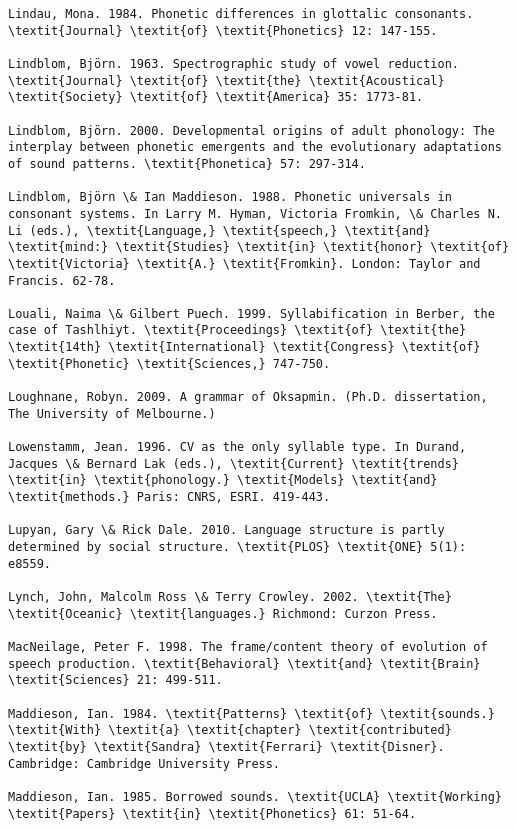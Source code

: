 \begin{verbatim}
Lindau, Mona. 1984. Phonetic differences in glottalic consonants. \textit{Journal} \textit{of} \textit{Phonetics} 12: 147-155.

Lindblom, Björn. 1963. Spectrographic study of vowel reduction. \textit{Journal} \textit{of} \textit{the} \textit{Acoustical} \textit{Society} \textit{of} \textit{America} 35: 1773-81.

Lindblom, Björn. 2000. Developmental origins of adult phonology: The interplay between phonetic emergents and the evolutionary adaptations of sound patterns. \textit{Phonetica} 57: 297-314.

Lindblom, Björn \& Ian Maddieson. 1988. Phonetic universals in consonant systems. In Larry M. Hyman, Victoria Fromkin, \& Charles N. Li (eds.), \textit{Language,} \textit{speech,} \textit{and} \textit{mind:} \textit{Studies} \textit{in} \textit{honor} \textit{of} \textit{Victoria} \textit{A.} \textit{Fromkin}. London: Taylor and Francis. 62-78.

Louali, Naima \& Gilbert Puech. 1999. Syllabification in Berber, the case of Tashlhiyt. \textit{Proceedings} \textit{of} \textit{the} \textit{14th} \textit{International} \textit{Congress} \textit{of} \textit{Phonetic} \textit{Sciences,} 747-750.

Loughnane, Robyn. 2009. A grammar of Oksapmin. (Ph.D. dissertation, The University of Melbourne.)

Lowenstamm, Jean. 1996. CV as the only syllable type. In Durand, Jacques \& Bernard Lak (eds.), \textit{Current} \textit{trends} \textit{in} \textit{phonology.} \textit{Models} \textit{and} \textit{methods.} Paris: CNRS, ESRI. 419-443.

Lupyan, Gary \& Rick Dale. 2010. Language structure is partly determined by social structure. \textit{PLOS} \textit{ONE} 5(1): e8559.

Lynch, John, Malcolm Ross \& Terry Crowley. 2002. \textit{The} \textit{Oceanic} \textit{languages.} Richmond: Curzon Press.

MacNeilage, Peter F. 1998. The frame/content theory of evolution of speech production. \textit{Behavioral} \textit{and} \textit{Brain} \textit{Sciences} 21: 499-511.

Maddieson, Ian. 1984. \textit{Patterns} \textit{of} \textit{sounds.} \textit{With} \textit{a} \textit{chapter} \textit{contributed} \textit{by} \textit{Sandra} \textit{Ferrari} \textit{Disner}. Cambridge: Cambridge University Press.

Maddieson, Ian. 1985. Borrowed sounds. \textit{UCLA} \textit{Working} \textit{Papers} \textit{in} \textit{Phonetics} 61: 51-64.


\end{verbatim}
